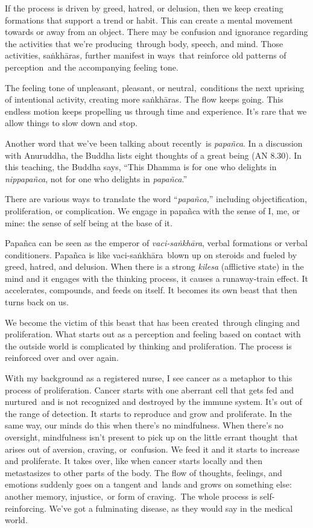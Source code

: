 If the process is driven by greed, hatred, or delusion, then we keep creating formations that support a trend or habit. This can create a mental movement towards or away from an object. There may be confusion and ignorance regarding the activities that we're producing~through body, speech, and mind. Those activities, saṅkhāras\emph{,} further manifest in ways~that reinforce old patterns of perception~and the accompanying feeling tone.

The feeling tone of unpleasant, pleasant, or neutral,~conditions the next uprising of intentional activity, creating more saṅkhāras\emph{.} The flow keeps going. This endless motion keeps propelling us through time and experience. It's rare that we allow things to slow down and stop.

Another word that we've been talking about recently~is \emph{papañca}. In a discussion with Anuruddha, the Buddha lists eight thoughts of a great being (AN 8.30). In this teaching, the Buddha says, ``This Dhamma is for one who delights in \emph{nippapañca}, not for one who delights in \emph{papañca}.''

There are various ways to translate the word ``\emph{papañca,}'' including objectification, proliferation, or complication. We engage in papañca with the sense of I, me, or mine: the sense of self being at the base of it.

Papañca can be seen as the emperor of \emph{vaci-saṅkhāra}, verbal formations or verbal conditioners. Papañca is like vaci-saṅkhāra~blown up on steroids and fueled by greed, hatred, and delusion. When there is a strong \emph{kilesa} (afflictive state) in the mind and it engages with the thinking process, it causes a runaway-train effect. It accelerates, compounds, and feeds on itself. It becomes its own beast that then turns back on us.

We become the victim of this beast that has been created~through clinging and proliferation. What starts out as a perception and feeling based on contact with the outside world is complicated by thinking and proliferation. The process is reinforced over and over again.~

With my background as a registered nurse, I see cancer as a metaphor to this process of proliferation. Cancer starts with one aberrant cell that gets fed and nurtured~and is not recognized and destroyed by the immune system. It's out of the range of detection. It starts to reproduce and grow and proliferate. In the same way, our minds do this when there's no mindfulness. When there's no oversight, mindfulness isn't present to pick up on the little errant thought~that arises out of aversion, craving, or~confusion. We feed it and it starts to increase and proliferate. It takes over, like when cancer starts locally and then metastasizes to other parts of the body. The flow of thoughts, feelings, and emotions suddenly goes on a tangent and~lands and grows on something else: another memory, injustice,~or form of craving.~The whole process is self-reinforcing. We've got a fulminating disease, as they would say in the medical world.

